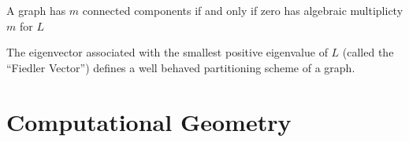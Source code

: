 \documentclass{beamer}
\begin{document}
\begin{frame}
    \begin{theorem}
        A graph has $m$ connected components if and only if zero has algebraic multiplicty $m$ for $L$
    \end{theorem}
    \begin{theorem}
        The eigenvector associated with the smallest positive eigenvalue of $L$ (called the ``Fiedler Vector'') defines a well behaved partitioning scheme of a graph.
    \end{theorem}
\end{frame}

\section{Computational Geometry}
\end{document}
